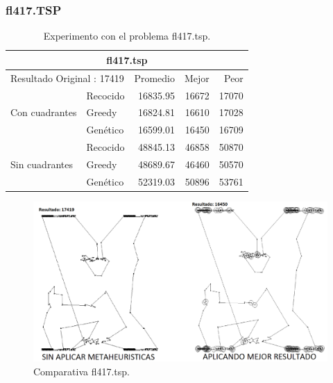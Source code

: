 \subsubsection{fl417.TSP}
\begin{table}[hbtp]
 \centering 
    \caption{Experimento con el problema fl417.tsp.}
	\begin{tabular}{ | l   l | r | r | r |   }
       \hline\multicolumn{5}{|c|}{ \rowcolor[gray]{0.8} fl417.tsp} \\\hline
        \multicolumn{2}{|l|}{Resultado Original : 17419} & Promedio & Mejor & Peor \\ 
                \hline
                & Recocido  & 16835.95 & 16672 & 17070  \\ 
 Con cuadrantes & Greedy    & 16824.81 & 16610 & 17028  \\ 
                & Genético  & \cellcolor[gray]{0.9} 16599.01 & \cellcolor[gray]{0.9} 16450 & \cellcolor[gray]{0.9} 16709 \\ 
                \hline
                & Recocido  & 48845.13 & 46858 & 50870   \\ 
 Sin cuadrantes & Greedy    & \cellcolor[gray]{0.9} 48689.67 & \cellcolor[gray]{0.9} 46460 & \cellcolor[gray]{0.9} 50570 \\ 
                & Genético  & 52319.03 & 50896 & 53761    \\ 
                \hline
    \end{tabular}
    \label{table:EXP_fl417.tsp}
\end{table}
\begin{figure}[hbtp]
    \centering
        \includegraphics[width=1\textwidth]{PruebasResultados/Experimentos_Comparativas/fl417.png}
        \caption{Comparativa fl417.tsp.}
        \label{fig:fl417_comparativa.png}
\end{figure}
